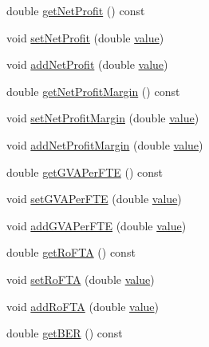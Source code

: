 \begin{DoxyCompactItemize}
\item 
double \mbox{\hyperlink{class_vessel_data_a252cf0af7b88a207b8d7a82250c4b07e}{get\+Net\+Profit}} () const
\item 
void \mbox{\hyperlink{class_vessel_data_a92c016f91dbca6677695e6bcce4e40f5}{set\+Net\+Profit}} (double \mbox{\hyperlink{diffusion_8cpp_a4b41795815d9f3d03abfc739e666d5da}{value}})
\item 
void \mbox{\hyperlink{class_vessel_data_a874fcedc2ee86909c2fab33c682164a5}{add\+Net\+Profit}} (double \mbox{\hyperlink{diffusion_8cpp_a4b41795815d9f3d03abfc739e666d5da}{value}})
\item 
double \mbox{\hyperlink{class_vessel_data_ac3f7b4c07e9a80880a87ff323b8139b8}{get\+Net\+Profit\+Margin}} () const
\item 
void \mbox{\hyperlink{class_vessel_data_a8b2df1a1f50d91c17adb803c05255444}{set\+Net\+Profit\+Margin}} (double \mbox{\hyperlink{diffusion_8cpp_a4b41795815d9f3d03abfc739e666d5da}{value}})
\item 
void \mbox{\hyperlink{class_vessel_data_a6cf0b16c6070fb0b71a2a94aa0255d59}{add\+Net\+Profit\+Margin}} (double \mbox{\hyperlink{diffusion_8cpp_a4b41795815d9f3d03abfc739e666d5da}{value}})
\item 
double \mbox{\hyperlink{class_vessel_data_a468b0f2ae3267953eff62331e500331d}{get\+G\+V\+A\+Per\+F\+TE}} () const
\item 
void \mbox{\hyperlink{class_vessel_data_add595605333472ade1a1e2cae0ec7fcd}{set\+G\+V\+A\+Per\+F\+TE}} (double \mbox{\hyperlink{diffusion_8cpp_a4b41795815d9f3d03abfc739e666d5da}{value}})
\item 
void \mbox{\hyperlink{class_vessel_data_a6ecab102c1c1fda1dadc4b8c36a183b6}{add\+G\+V\+A\+Per\+F\+TE}} (double \mbox{\hyperlink{diffusion_8cpp_a4b41795815d9f3d03abfc739e666d5da}{value}})
\item 
double \mbox{\hyperlink{class_vessel_data_aeaf3e35cd70fc77e3a486a10d20e0279}{get\+Ro\+F\+TA}} () const
\item 
void \mbox{\hyperlink{class_vessel_data_a0da40a44c39acaedeccaae46bfc59722}{set\+Ro\+F\+TA}} (double \mbox{\hyperlink{diffusion_8cpp_a4b41795815d9f3d03abfc739e666d5da}{value}})
\item 
void \mbox{\hyperlink{class_vessel_data_aba0c86b44adb1fcce2a611d05efc365c}{add\+Ro\+F\+TA}} (double \mbox{\hyperlink{diffusion_8cpp_a4b41795815d9f3d03abfc739e666d5da}{value}})
\item 
double \mbox{\hyperlink{class_vessel_data_acfdee7224cd6caa5dcb21a8b3bb72c80}{get\+B\+ER}} () const
\item 

\end{DoxyCompactItemize}
